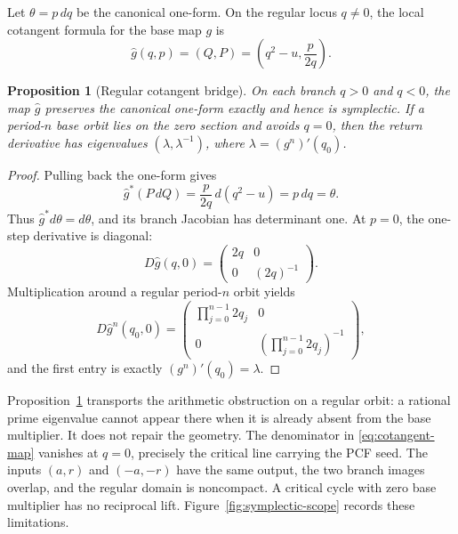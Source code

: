 \documentclass[11pt]{article}
\newtheorem{proposition}[theorem]{Proposition}
\theoremstyle{remark}
\begin{document}
Let \(\theta=p\,dq\) be the canonical one-form.  On the regular locus
\(q\ne0\), the local cotangent formula for the base map \(g\) is
\begin{equation}
 \widehat g(q,p)=(Q,P)
 =\left(q^2-u,\frac{p}{2q}\right).
 \label{eq:cotangent-map}
\end{equation}

\begin{proposition}[Regular cotangent bridge]
\label{prop:cotangent}
On each branch \(q>0\) and \(q<0\), the map \(\widehat g\) preserves the
canonical one-form exactly and hence is symplectic.  If a period-\(n\) base
orbit lies on the zero section and avoids \(q=0\), then the return derivative
has eigenvalues \((\lambda,\lambda^{-1})\), where \(\lambda=(g^n)'(q_0)\).
\end{proposition}

\begin{proof}
Pulling back the one-form gives
\begin{equation}
 \widehat g^{*}(P\,dQ)
 =\frac{p}{2q}\,d(q^2-u)=p\,dq=\theta.
 \label{eq:one-form}
\end{equation}
Thus \(\widehat g^*d\theta=d\theta\), and its branch Jacobian has determinant
one.  At \(p=0\), the one-step derivative is diagonal:
\begin{equation}
 D\widehat g(q,0)=
 \begin{pmatrix}2q&0\\0&(2q)^{-1}\end{pmatrix}.
 \label{eq:zero-section-derivative}
\end{equation}
Multiplication around a regular period-\(n\) orbit yields
\begin{equation}
 D\widehat g^n(q_0,0)=
 \begin{pmatrix}\prod_{j=0}^{n-1}2q_j&0\\
 0&\left(\prod_{j=0}^{n-1}2q_j\right)^{-1}
 \end{pmatrix},
 \label{eq:return-pair}
\end{equation}
and the first entry is exactly \((g^n)'(q_0)=\lambda\).
\end{proof}

Proposition~\ref{prop:cotangent} transports the arithmetic obstruction on a
regular orbit: a rational prime eigenvalue cannot appear there when it is
already absent from the base multiplier.  It does not repair the geometry.
The denominator in \eqref{eq:cotangent-map} vanishes at \(q=0\), precisely the
critical line carrying the PCF seed.  The inputs \((a,r)\) and \((-a,-r)\)
have the same output, the two branch images overlap, and the regular domain is
noncompact.  A critical cycle with zero base multiplier has no reciprocal
lift.  Figure~\ref{fig:symplectic-scope} records these limitations.
\end{document}
